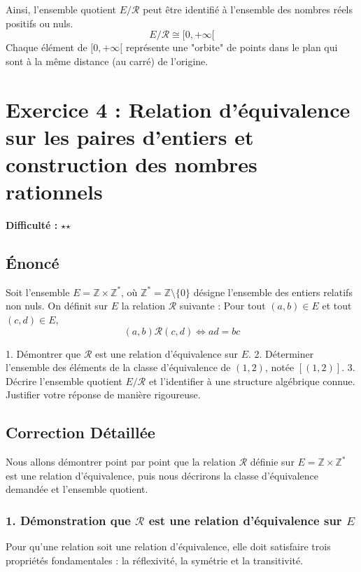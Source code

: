\documentclass{report}
\begin{document}
Ainsi, l'ensemble quotient $E/\mathcal{R}$ peut être identifié à l'ensemble des nombres réels positifs ou nuls.
$$ E/\mathcal{R} \cong [0, +\infty[ $$
Chaque élément de $[0, +\infty[$ représente une "orbite" de points dans le plan qui sont à la même distance (au carré) de l'origine.
\newpage
\chapter*{Exercice 4 : Relation d'équivalence sur les paires d'entiers et construction des nombres rationnels}
\textbf{Difficulté :} $\star$$\star$

\section*{Énoncé}
Soit l'ensemble $E = \mathbb{Z} \times \mathbb{Z}^*$, où $\mathbb{Z}^* = \mathbb{Z} \setminus \{0\}$ désigne l'ensemble des entiers relatifs non nuls.
On définit sur $E$ la relation $\mathcal{R}$ suivante :
Pour tout $(a,b) \in E$ et tout $(c,d) \in E$,
$$ (a,b) \mathcal{R} (c,d) \iff ad = bc $$

1.  Démontrer que $\mathcal{R}$ est une relation d'équivalence sur $E$.
2.  Déterminer l'ensemble des éléments de la classe d'équivalence de $(1,2)$, notée $[(1,2)]$.
3.  Décrire l'ensemble quotient $E/\mathcal{R}$ et l'identifier à une structure algébrique connue. Justifier votre réponse de manière rigoureuse.

\section*{Correction Détaillée}

Nous allons démontrer point par point que la relation $\mathcal{R}$ définie sur $E = \mathbb{Z} \times \mathbb{Z}^*$ est une relation d'équivalence, puis nous décrirons la classe d'équivalence demandée et l'ensemble quotient.

\subsection*{1. Démonstration que $\mathcal{R}$ est une relation d'équivalence sur $E$}

Pour qu'une relation soit une relation d'équivalence, elle doit satisfaire trois propriétés fondamentales : la réflexivité, la symétrie et la transitivité.
\end{document}
